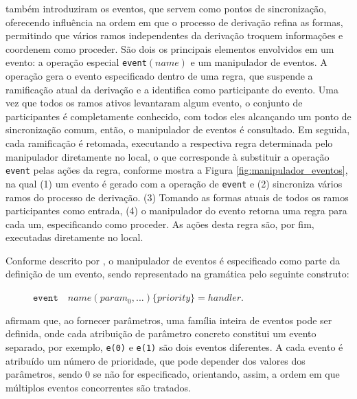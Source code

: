  também introduziram os eventos, que servem como pontos de sincronização, oferecendo influência na ordem em que o processo de derivação refina as formas, permitindo que vários ramos independentes da derivação troquem informações e coordenem como proceder. São dois os principais elementos envolvidos em um evento: a operação especial \texttt{event}$(name)$ e um manipulador de eventos. A operação gera o evento especificado dentro de uma regra, que suspende a ramificação atual da derivação e a identifica como participante do evento. Uma vez que todos os ramos ativos levantaram algum evento, o conjunto de participantes é completamente conhecido, com todos eles alcançando um ponto de sincronização comum, então, o manipulador de eventos é consultado. Em seguida, cada ramificação é retomada, executando a respectiva regra determinada pelo manipulador diretamente no local, o que corresponde à substituir a operação \texttt{event} pelas ações da regra, conforme mostra a Figura \ref{fig:manipulador_eventos}, na qual (1) um evento é gerado com a operação de \texttt{event} e (2) sincroniza vários ramos do processo de derivação. (3) Tomando as formas atuais de todos os ramos participantes como entrada, (4) o manipulador do evento retorna uma regra para cada um, especificando como proceder. As ações desta regra são, por fim, executadas diretamente no local.

Conforme descrito por , o manipulador de eventos é especificado como parte da definição de um evento, sendo representado na gramática pelo seguinte construto:

\vspace{0.5cm}

\begin{description}
    \item[] \qquad \qquad $\texttt{event} \quad name(param_0 ,. . . ) \{ priority \} = handler$.
\end{description}

\vspace{0.5cm}

 afirmam que, ao fornecer parâmetros, uma família inteira de eventos pode ser definida, onde cada atribuição de parâmetro concreto constitui um evento separado, por exemplo, \texttt{e(0)} e \texttt{e(1)} são dois eventos diferentes. A cada evento é atribuído um número de prioridade, que pode depender dos valores dos parâmetros, sendo 0 se não for especificado, orientando, assim, a ordem em que múltiplos eventos concorrentes são tratados.

